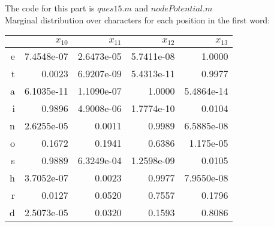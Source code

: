 \documentclass[11pt]{article}
\begin{document}
\begin{problem}{20}
The code for this part is $ques15.m$ and $nodePotential.m$\\
Marginal distribution over characters for each position in the first word:
\begin{center}
\begin{tabular}{r|r|r|r|r}
 & $x_{10}$ & $x_{11}$ & $x_{12}$ & $x_{13}$ \\\hline
e  & 7.4548e-07 & 2.6473e-05 & 5.7411e-08 & 1.0000 \\\hline
t  & 0.0023 & 6.9207e-09 & 5.4313e-11 & 0.9977 \\\hline
a  & 6.1035e-11 & 1.1090e-07 & 1.0000 & 5.4864e-14 \\\hline
i  & 0.9896 & 4.9008e-06 & 1.7774e-10 & 0.0104 \\\hline
n  & 2.6255e-05 & 0.0011 & 0.9989 & 6.5885e-08 \\\hline
o  & 0.1672 & 0.1941 & 0.6386 & 1.175e-05 \\\hline
s  & 0.9889 & 6.3249e-04 & 1.2598e-09 & 0.0105 \\\hline
h  & 3.7052e-07 & 0.0023 & 0.9977 & 7.9550e-08 \\\hline
r  & 0.0127 & 0.0520 & 0.7557 & 0.1796 \\\hline
d  & 2.5073e-05 & 0.0320 & 0.1593 & 0.8086 \\\hline
\end{tabular}
\end{center}

\end{problem}
\end{document}
